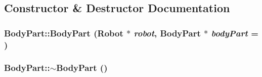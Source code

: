 \subsection{Constructor \& Destructor Documentation}
\hypertarget{class_robot_model_1_1_body_part_a1f6265932a76d89dc77b0b6185966913}{
\subsubsection[{BodyPart}]{\setlength{\rightskip}{0pt plus 5cm}BodyPart::BodyPart ({\bf Robot} $\ast$ {\em robot}, \/  {\bf BodyPart} $\ast$ {\em bodyPart} = {})}}
\label{class_robot_model_1_1_body_part_a1f6265932a76d89dc77b0b6185966913}
\hypertarget{class_robot_model_1_1_body_part_a0d51eaacbf15745175b21bf44f67a92a}{
\subsubsection[{$\sim$BodyPart}]{\setlength{\rightskip}{0pt plus 5cm}BodyPart::$\sim$BodyPart ()}}
\label{class_robot_model_1_1_body_part_a0d51eaacbf15745175b21bf44f67a92a}


